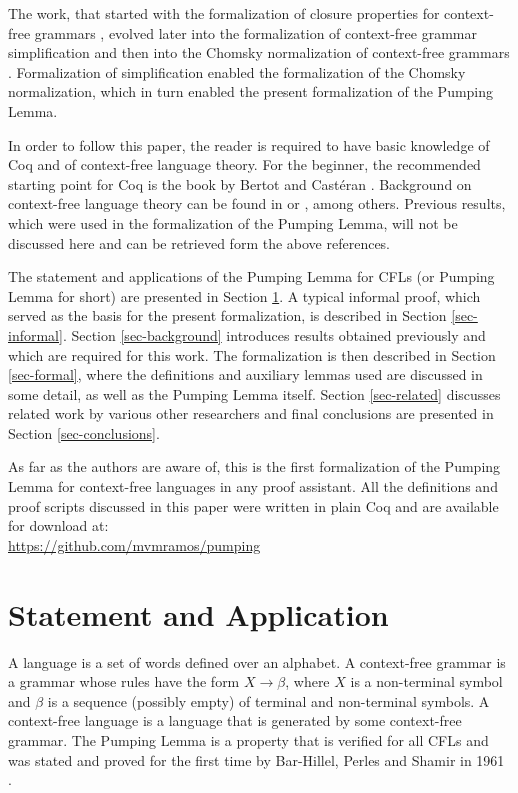 \documentclass {elsarticle}
\begin{document}
The work, that started with the formalization of closure properties for context-free grammars \cite {ramos-2014}, evolved later into the formalization of context-free grammar simplification \cite {ramos-2015} and then into the Chomsky normalization of context-free grammars \cite {ramos-2016}. Formalization of simplification enabled the formalization of the Chomsky normalization, which in turn enabled the present formalization of the Pumping Lemma.

In order to follow this paper, the reader is required to have basic knowledge of Coq and of context-free language theory. For the beginner, the recommended starting point for Coq is the book by Bertot and Castéran \cite {bertot-2004}. Background on context-free language theory can be found in \cite {sudkamp-2006} or \cite {ramos-2009}, among others. Previous results, which were used in the formalization of the Pumping Lemma, will not be discussed here and can be retrieved form the above references.

The statement and applications of the Pumping Lemma for CFLs (or Pumping Lemma for short) are presented in Section \ref {sec-pumping}. A typical informal proof, which served as the basis for the present formalization, is described in Section \ref {sec-informal}. Section \ref {sec-background} introduces results obtained previously and which are required for this work. The formalization is then described in Section \ref {sec-formal}, where the definitions and auxiliary lemmas used are discussed in some detail, as well as the Pumping Lemma itself. Section \ref {sec-related} discusses related work by various other researchers and final conclusions are presented in Section \ref {sec-conclusions}.

As far as the authors are aware of, this is the first formalization of the Pumping Lemma for context-free languages in any proof assistant. All the definitions and proof scripts discussed in this paper were written in plain Coq and are available for download at: \\
\url {https://github.com/mvmramos/pumping} \\

\section {Statement and Application}
\label {sec-pumping}

A language is a set of words defined over an alphabet. A context-free grammar is a grammar whose rules have the form $X \rightarrow \beta$, where $X$ is a non-terminal symbol and $\beta$ is a sequence (possibly empty) of terminal and non-terminal symbols. A context-free language is a language that is generated by some context-free grammar. The Pumping Lemma is a property that is verified for all CFLs and was stated and proved for the first time by Bar-Hillel, Perles and Shamir in 1961 \cite {bar-hillel-1961}.
\end{document}
